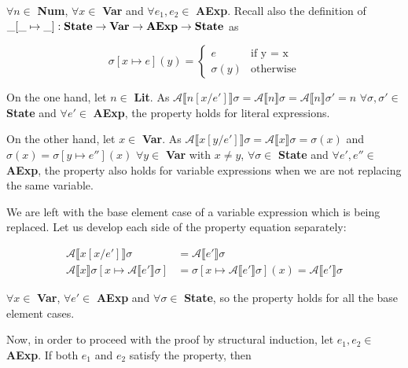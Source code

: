\documentclass{article}
\begin{document}
\begin{enumerate}[(a)]
    $\forall n \in$ \textbf{Num}, $\forall x \in$ \textbf{Var} and $\forall
    e_1, e_2 \in$ \textbf{AExp}. Recall also the definition of $\_[\_ \mapsto \_] : 
    \text{\textbf{State}} \rightarrow 
    \text{\textbf{Var}} \rightarrow
    \text{\textbf{AExp}} \rightarrow
    \text{\textbf{State}}$ as 
    
    $$
      \sigma[x \mapsto e](y) = 
        \begin{cases}
          e & \text{if y = x} \\ 
          \sigma(y) & \text{otherwise}
        \end{cases}
    $$

    On the one hand, let $n \in$ \textbf{Lit}. As $\mathcal{A}\llbracket n[x/e']\rrbracket 
    \sigma = \mathcal{A} \llbracket n \rrbracket \sigma = 
    \mathcal{A} \llbracket n \rrbracket \sigma' = n$ 
    $\forall \sigma, \sigma' \in$ \textbf{State} and $\forall e' \in$ 
    \textbf{AExp}, the property holds for literal expressions.
    
    On the other hand, let $x \in$ \textbf{Var}. As $\mathcal{A} \llbracket
    x[y/e'] \rrbracket \sigma = \mathcal{A} \llbracket x \rrbracket \sigma
    = \sigma(x)$ and $\sigma(x) = \sigma[y \mapsto e''](x)$ $\forall y \in$
    \textbf{Var} with $x \neq y$, $\forall \sigma \in$ \textbf{State} and
    $\forall e', e'' \in$ \textbf{AExp}, the property also holds for
    variable expressions when we are not replacing the same variable.

    We are left with the base element case of a variable expression which 
    is being replaced. Let us develop each side of the property equation
    separately:

    \begin{align*}
      \mathcal{A}\llbracket x[x/e']\rrbracket \sigma &=
        \mathcal{A}\llbracket e' \rrbracket \sigma \\
      \mathcal{A}\llbracket x\rrbracket \sigma [x \mapsto 
      \mathcal{A}\llbracket e' \rrbracket\sigma] &= \sigma [x \mapsto 
      \mathcal{A}\llbracket e' \rrbracket\sigma](x) = 
      \mathcal{A}\llbracket e' \rrbracket\sigma
    \end{align*}

    $\forall x \in$ \textbf{Var}, $\forall e' \in$ \textbf{AExp} and $\forall
    \sigma \in$ \textbf{State}, so the property holds for all the base element cases. 

    Now, in order to proceed with the proof by structural induction, let $e_1,
    e_2 \in$ \textbf{AExp}. If both $e_1$ and $e_2$ satisfy the property,
    then


\end{enumerate}
\end{document}
